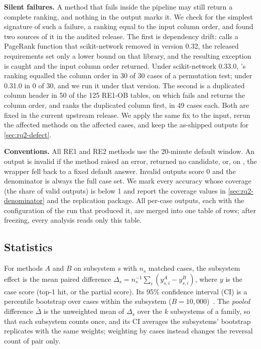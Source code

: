 \textbf{Silent failures.}
A method that fails inside the pipeline may still return a complete ranking, and nothing in the output marks it.
We check for the simplest signature of such a failure, a ranking equal to the input column order, and found two sources of it in the audited release.
The first is dependency drift: \causalrca calls a PageRank function that scikit-network removed in version 0.32, the released requirements set only a lower bound on that library, and the resulting exception is caught and the input column order returned.
Under scikit-network 0.33.0, \causalrca's ranking equalled the column order in 30 of 30 cases of a permutation test; under 0.31.0 in 0 of 30, and we run it under that version.
The second is a duplicated column header in 50 of the 125 RE1-OB tables, on which \circa fails and returns the column order, and \ediag ranks the duplicated column first, in 49 cases each.
Both are fixed in the current upstream release.
We apply the same fix to the input, rerun the affected methods on the affected cases, and keep the as-shipped outputs for \cref{sec:rq2-defect}.

\textbf{Conventions.}
All RE1 and RE2 methods use the 20-minute default window.
An output is invalid if the method raised an error, returned no candidate, or, on \openrca, the wrapper fell back to a fixed default answer.
Invalid outputs score 0 and the denominator is always the full case set.
We mark every accuracy whose coverage (the share of valid outputs) is below 1 and report the coverage values in \cref{sec:rq2-denominator} and the replication package.
All per-case outputs, each with the configuration of the run that produced it, are merged into one table of \NlongRows rows; after freezing, every analysis reads only this table.

\subsection{Statistics}
\label{sec:design-stats}

For methods $A$ and $B$ on subsystem $s$ with $n_s$ matched cases, the subsystem effect is the mean paired difference $\Delta_s = n_s^{-1}\sum_i (y^A_{s,i} - y^B_{s,i})$, where $y$ is the case score (top-1 hit, or the \openrca partial score).
Its 95\% confidence interval (CI) is a percentile bootstrap over cases within the subsystem ($B = 10{,}000$)~\citep{efron1993bootstrap}.
The \emph{pooled} difference $\bar\Delta$ is the unweighted mean of $\Delta_s$ over the $k$ subsystems of a family, so that each subsystem counts once, and its CI averages the subsystems' bootstrap replicates with the same weights; weighting by cases instead changes the reversal count of \NcwDiff pair only.

